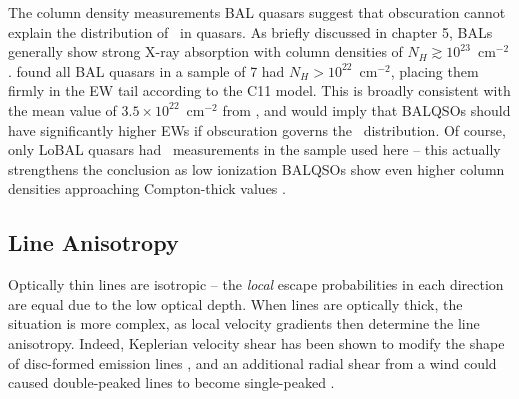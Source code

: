 The column density measurements BAL quasars suggest that obscuration 
cannot explain the distribution of \ewo\ in quasars. 
As briefly discussed in chapter 5, BALs generally show
strong X-ray absorption with column densities of $N_H\gtrsim10^{23}$~cm$^{-2}$
\citep{green1996,mathur2000,green2001,grupemathur2003}. \cite{gallagher1999}
found all BAL quasars in a sample of 7 had $N_H>10^{22}$~cm$^{-2}$, placing
them firmly in the EW tail according to the C11 model. This is broadly
consistent with the mean value of $3.5\times10^{22}$~cm$^{-2}$ from
\cite{marabito2014}, and would imply that BALQSOs should have significantly
higher EWs if obscuration governs the \ewo\ distribution.
Of course, only LoBAL quasars had \ewo\ measurements 
in the sample used here -- this actually strengthens the conclusion as low ionization 
BALQSOs show even higher column densities approaching Compton-thick values 
\citep{morabito2011}.


\subsection{Line Anisotropy}
\label{sec:line_aniso}

Optically thin lines are isotropic -- the {\em local}
escape probabilities in each direction are equal due to the 
low optical depth. 
When lines are optically thick, the situation is more
complex, as local velocity gradients then determine the line 
anisotropy. Indeed, Keplerian velocity shear has been shown to modify the
shape of disc-formed emission lines \citep{hornemarsh1986}, and an additional
radial shear from a wind could caused double-peaked lines
to become single-peaked \citep{MC96,MC97,flohic2012}.

